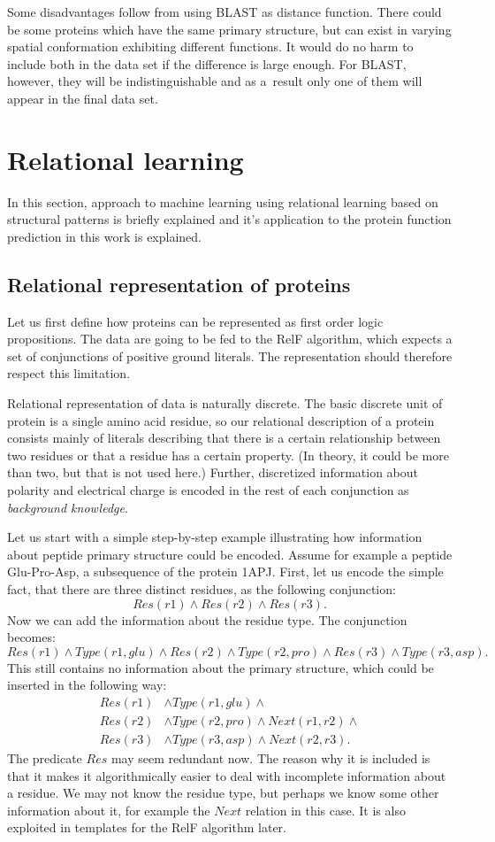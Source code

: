 \documentclass[11pt,twoside,a4paper]{book}
\begin{document}
Some disadvantages follow from using BLAST as distance function.
There could be some proteins which have the same primary structure, 
but can exist in varying spatial conformation exhibiting different functions.
It would do no harm to include both in the data set if the difference is large enough.
For BLAST, however, they will be indistinguishable and as a~result 
only one of them will appear in the final data set.

\section{Relational learning}
In this section, approach to machine learning using relational learning based on structural patterns
is briefly explained and 
it's application to the protein function prediction in this work is explained.

\subsection{Relational representation of proteins}
\label{ssec:relrepr}
Let us first define how proteins can be represented as first order logic propositions.
The data are going to be fed to the RelF algorithm,
which expects a set of conjunctions of positive ground literals.
The representation should therefore respect this limitation.

Relational representation of data is naturally discrete.
The basic discrete unit of protein is a single amino acid residue,
so our relational description of a protein consists mainly
of literals describing that there is a certain relationship between 
two residues or that a residue has a certain property.
(In theory, it could be more than two, but that is not used here.)
Further, discretized information about polarity and electrical charge
is encoded in the rest of each conjunction as \emph{background knowledge}.

Let us start with a simple step-by-step example illustrating how information about
peptide primary structure could be encoded.
Assume for example a peptide Glu-Pro-Asp, a subsequence of the protein 1APJ.
First, let us encode the simple fact,
that there are three distinct residues, as the following conjunction:
\[ Res(r1) \land Res(r2) \land Res(r3). \]
Now we can add the information about the residue type. The conjunction becomes:
\[ Res(r1) \land Type(r1, glu) \land Res(r2) \land Type(r2, pro) \land Res(r3) \land Type(r3, asp). \]
This still contains no information about the primary structure, 
which could be inserted in the following way:
\begin{align*}
Res(r1)& \land Type(r1, glu) \land \\
Res(r2)& \land Type(r2, pro) \land Next(r1, r2) \land \\
Res(r3)& \land Type(r3, asp) \land Next(r2, r3). 
\end{align*}
The predicate $Res$ may seem redundant now.
The reason why it is included is that it makes it algorithmically easier to deal with incomplete information about a residue.
We may not know the residue type, but perhaps we know some other information about it, for example the $Next$ relation in this case.
It is also exploited in templates for the RelF algorithm later.
\end{document}
